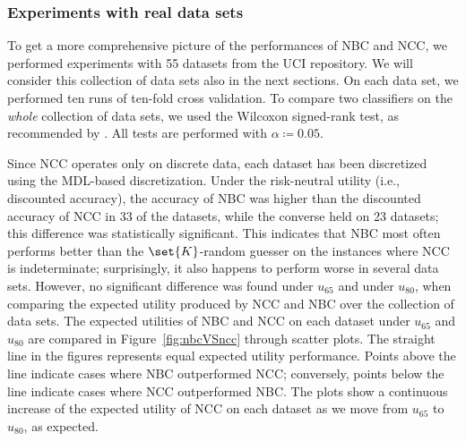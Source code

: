 \documentclass[a4paper,10pt,reqno]{amsart}
\theoremstyle{remark}
\begin{document}
\subsubsection{Experiments with real data sets} \label{sec:nbcvsncc}

To get a more comprehensive picture of the performances of NBC and NCC, we performed experiments with 55 datasets from the UCI repository.  We will consider this collection of data sets also in the next sections.  On each data set, we performed  ten runs of ten-fold cross validation.
To compare two classifiers on the \textit{whole} collection of data sets, we used the Wilcoxon signed-rank test, as recommended by \cite{demsar06jmlr}. 
All tests are performed with $\alpha\coloneqq0.05$. 


Since NCC operates only on discrete data, each dataset has been discretized using the MDL-based discretization.  Under the risk-neutral utility (i.e., discounted accuracy), the accuracy of NBC was higher than the discounted accuracy of NCC in 33 of the datasets, while the converse held on 23 datasets; this difference was statistically significant. This indicates that NBC most often performs better than the $\set{K}$-random guesser on the instances where NCC is indeterminate; surprisingly, it also happens to perform worse in several data sets. However, no significant difference was found under $u_{65}$ and under $u_{80}$, when comparing the expected utility produced by NCC and NBC over the collection of data sets.
The expected utilities of NBC and NCC on each dataset under $u_{65}$ and $u_{80}$ are compared in Figure~\ref{fig:nbcVSncc} through scatter plots. The straight line in the figures represents equal expected utility performance. Points above the line indicate cases where NBC outperformed NCC; conversely, points below the line indicate cases where NCC outperformed NBC. The plots show a continuous increase of the expected utility of NCC on each dataset as we move from $u_{65}$ to $u_{80}$,
as expected.
\end{document}

